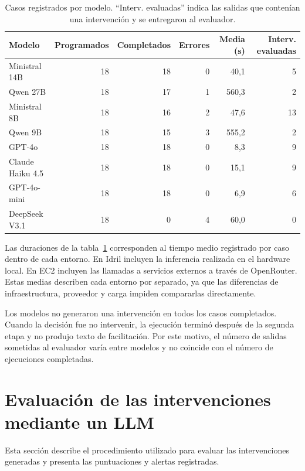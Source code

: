 \begin{table}[htbp]
\centering
\small
\begin{tabular}{lrrrrr}
\toprule
\textbf{Modelo} & \textbf{Programados} & \textbf{Completados} & \textbf{Errores} & \textbf{Media (s)} & \textbf{Interv. evaluadas} \\
\midrule
Ministral 14B & 18 & 18 & 0 & 40,1 & 5 \\
Qwen 27B & 18 & 17 & 1 & 560,3 & 2 \\
Ministral 8B & 18 & 16 & 2 & 47,6 & 13 \\
Qwen 9B & 18 & 15 & 3 & 555,2 & 2 \\
\midrule
GPT-4o & 18 & 18 & 0 & 8,3 & 9 \\
Claude Haiku 4.5 & 18 & 18 & 0 & 15,1 & 9 \\
GPT-4o-mini & 18 & 18 & 0 & 6,9 & 6 \\
DeepSeek V3.1 & 18 & 0 & 4 & 60,0 & 0 \\
\bottomrule
\end{tabular}
\caption{Casos registrados por modelo. ``Interv. evaluadas'' indica las salidas que contenían una intervención y se entregaron al evaluador.}
\label{tab:ejecuciones-modelos}
\end{table}

Las duraciones de la tabla~\ref{tab:ejecuciones-modelos} corresponden al tiempo medio registrado por caso dentro de cada entorno. En Idril incluyen la inferencia realizada en el hardware local. En EC2 incluyen las llamadas a servicios externos a través de OpenRouter. Estas medias describen cada entorno por separado, ya que las diferencias de infraestructura, proveedor y carga impiden compararlas directamente.

Los modelos no generaron una intervención en todos los casos completados. Cuando la decisión fue no intervenir, la ejecución terminó después de la segunda etapa y no produjo texto de facilitación. Por este motivo, el número de salidas sometidas al evaluador varía entre modelos y no coincide con el número de ejecuciones completadas.

\section{Evaluación de las intervenciones mediante un LLM}
\label{sec:judge-resultados}

Esta sección describe el procedimiento utilizado para evaluar las intervenciones generadas y presenta las puntuaciones y alertas registradas.

